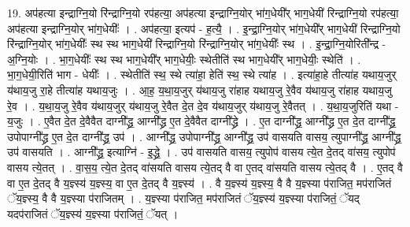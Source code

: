 \documentclass[17pt]{extarticle}
\begin{document}
19. अप॑हत्या इन्द्राग्नि॒यो रि॑न्द्राग्नि॒यो रप॑हत्या॒ अप॑हत्या इन्द्राग्नि॒योर् भा॑ग॒धेयी᳚र् भाग॒धेयी॑ रिन्द्राग्नि॒यो रप॑हत्या॒ अप॑हत्या इन्द्राग्नि॒योर् भा॑ग॒धेयीः᳚ । . अप॑हत्या॒ इत्यप॑ - ह॒त्यै॒ । . इ॒न्द्रा॒ग्नि॒योर् भा॑ग॒धेयी᳚र् भाग॒धेयी॑ रिन्द्राग्नि॒यो रि॑न्द्राग्नि॒योर् भा॑ग॒धेयीः᳚ स्थ स्थ भाग॒धेयी॑ रिन्द्राग्नि॒यो रि॑न्द्राग्नि॒योर् भा॑ग॒धेयीः᳚ स्थ । . इ॒न्द्रा॒ग्नि॒योरिती᳚न्द्र - अ॒ग्नि॒योः । . भा॒ग॒धेयीः᳚ स्थ स्थ भाग॒धेयी᳚र् भाग॒धेयीः॒ स्थेतीति॑ स्थ भाग॒धेयी᳚र् भाग॒धेयीः॒ स्थेति॑ । . भा॒ग॒धेयी॒रिति॑ भाग - धेयीः᳚ । . स्थेतीति॑ स्थ॒ स्थे त्या॑हा॒ हेति॑ स्थ॒ स्थे त्या॑ह । . इत्या॑हा॒हे तीत्या॑ह यथाय॒जुर् य॑थाय॒जु रा॒हे तीत्या॑ह यथाय॒जुः । . आ॒ह॒ य॒था॒य॒जुर् य॑थाय॒जु रा॑हाह यथाय॒जु रे॒वैव य॑थाय॒जु रा॑हाह यथाय॒जु रे॒व । . य॒था॒य॒जु रे॒वैव य॑थाय॒जुर् य॑थाय॒जु रे॒वैत दे॒त दे॒व य॑थाय॒जुर् य॑थाय॒जु रे॒वैतत् । . य॒था॒य॒जुरिति॑ यथा - य॒जुः । . ए॒वैत दे॒त दे॒वैवैत दाग्नी᳚द्ध्र॒ आग्नी᳚द्ध्र ए॒त दे॒वैवैत दाग्नी᳚द्ध्रे । . ए॒त दाग्नी᳚द्ध्र॒ आग्नी᳚द्ध्र ए॒त दे॒त दाग्नी᳚द्ध्र॒ उपोपाग्नी᳚द्ध्र ए॒त दे॒त दाग्नी᳚द्ध्र॒ उप॑ । . आग्नी᳚द्ध्र॒ उपोपाग्नी᳚द्ध्र॒ आग्नी᳚द्ध्र॒ उप॑ वासयति वासय॒ त्युपाग्नी᳚द्ध्र॒ आग्नी᳚द्ध्र॒ उप॑ वासयति । . आग्नी᳚द्ध्र॒ इत्याग्नि॑ - इ॒द्ध्रे॒ । . उप॑ वासयति वासय॒ त्युपोप॑ वासय त्ये॒त दे॒तद् वा॑सय॒ त्युपोप॑ वासय त्ये॒तत् । . वा॒स॒य॒ त्ये॒त दे॒तद् वा॑सयति वासय त्ये॒तद् वै वा ए॒तद् वा॑सयति वासय त्ये॒तद् वै । . ए॒तद् वै वा ए॒त दे॒तद् वै य॒ज्ञ्स्य॑ य॒ज्ञ्स्य॒ वा ए॒त दे॒तद् वै य॒ज्ञ्स्य॑ । . वै य॒ज्ञ्स्य॑ य॒ज्ञ्स्य॒ वै वै य॒ज्ञ्स्या प॑राजित॒ मप॑राजितं ॅय॒ज्ञ्स्य॒ वै वै य॒ज्ञ्स्या प॑राजितम् । . य॒ज्ञ्स्या प॑राजित॒ मप॑राजितं ॅय॒ज्ञ्स्य॑ य॒ज्ञ्स्या प॑राजितं॒ ॅयद् यदप॑राजितं ॅय॒ज्ञ्स्य॑ य॒ज्ञ्स्या प॑राजितं॒ ॅयत् । \newline
\end{document}

